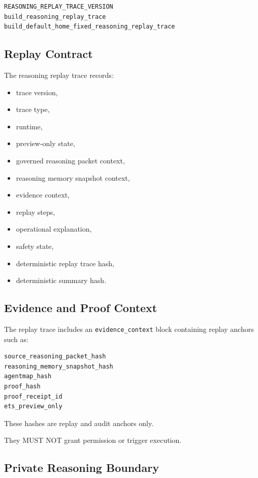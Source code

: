 \begin{verbatim}
REASONING_REPLAY_TRACE_VERSION
build_reasoning_replay_trace
build_default_home_fixed_reasoning_replay_trace
\end{verbatim}

\subsection{Replay Contract}

The reasoning replay trace records:

\begin{itemize}
  \item trace version,
  \item trace type,
  \item runtime,
  \item preview-only state,
  \item governed reasoning packet context,
  \item reasoning memory snapshot context,
  \item evidence context,
  \item replay steps,
  \item operational explanation,
  \item safety state,
  \item deterministic replay trace hash,
  \item deterministic summary hash.
\end{itemize}

\subsection{Evidence and Proof Context}

The replay trace includes an \texttt{evidence\_context} block containing replay anchors such as:

\begin{verbatim}
source_reasoning_packet_hash
reasoning_memory_snapshot_hash
agentmap_hash
proof_hash
proof_receipt_id
ets_preview_only
\end{verbatim}

These hashes are replay and audit anchors only.

They MUST NOT grant permission or trigger execution.

\subsection{Private Reasoning Boundary}


